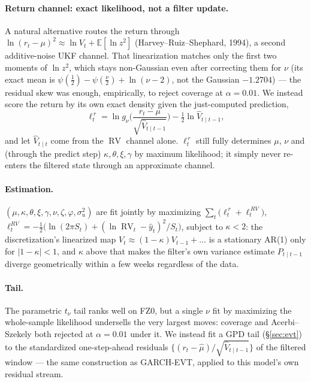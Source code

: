 \documentclass[11pt,a4paper]{article}
\newcommand{\E}{\mathbb{E}}
\newcommand{\RV}{\operatorname{RV}}
\begin{document}
\paragraph{Return channel: exact likelihood, not a filter update.} A natural
alternative routes the return through
$\ln(r_t-\mu)^2 \approx \ln V_t + \E[\ln z^2]$
(Harvey--Ruiz--Shephard, 1994), a second additive-noise UKF channel. That
linearization matches only the first two moments of $\ln z^2$, which stays
non-Gaussian even after correcting them for $\nu$ (its exact mean is
$\psi(\tfrac12)-\psi(\tfrac\nu2)+\ln(\nu-2)$, not the Gaussian $-1.2704$) ---
the residual skew was enough, empirically, to reject coverage at
$\alpha=0.01$. We instead score the return by its own exact density given
the just-computed prediction,
\begin{equation}
  \ell_t^{\,r} = \ln g_\nu\!\Big(\frac{r_t-\mu}{\sqrt{\hat V_{t\mid t-1}}}\Big)
                 - \tfrac12\ln \hat V_{t\mid t-1},
\end{equation}
and let $\hat V_{t\mid t}$ come from the $\RV$ channel alone. $\ell_t^{\,r}$
still fully determines $\mu$, $\nu$ and (through the predict step)
$\kappa,\theta,\xi,\gamma$ by maximum likelihood; it simply never re-enters
the filtered state through an approximate channel.

\paragraph{Estimation.} $(\mu,\kappa,\theta,\xi,\gamma,\nu,\zeta,\varphi,
\sigma_u^2)$ are fit jointly by maximizing
$\sum_t\big(\ell_t^{\,r}+\ell_t^{\,RV}\big)$,
$\ell_t^{RV}=-\tfrac12\big(\ln(2\pi S_t)+(\ln\RV_t-\hat y_t)^2/S_t\big)$,
subject to $\kappa<2$: the discretization's linearized map
$V_t\approx(1-\kappa)V_{t-1}+\ldots$ is a stationary AR(1) only for
$|1-\kappa|<1$, and $\kappa$ above that makes the filter's own variance
estimate $P_{t\mid t-1}$ diverge geometrically within a few weeks regardless
of the data.

\paragraph{Tail.} The parametric $t_\nu$ tail ranks well on FZ0, but a single
$\nu$ fit by maximizing the whole-sample likelihood undersells the very
largest moves: coverage and Acerbi--Szekely both rejected at $\alpha=0.01$
under it. We instead fit a GPD tail (\S\ref{sec:evt}) to the standardized
one-step-ahead residuals $\{(r_t-\hat\mu)/\sqrt{\hat V_{t\mid t-1}}\}$ of the
filtered window --- the same construction as GARCH-EVT, applied to this
model's own residual stream.
\end{document}
